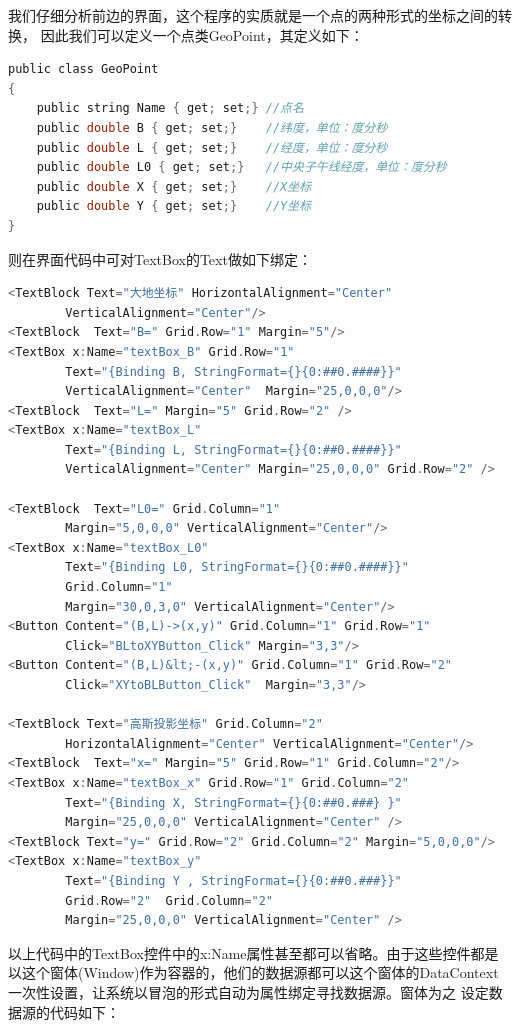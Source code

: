 我们仔细分析前边的界面，这个程序的实质就是一个点的两种形式的坐标之间的转换，
因此我们可以定义一个点类GeoPoint，其定义如下：

\begin{lstlisting}[language=C]
public class GeoPoint
{
    public string Name { get; set;} //点名
    public double B { get; set;}    //纬度，单位：度分秒
    public double L { get; set;}    //经度，单位：度分秒
    public double L0 { get; set;}   //中央子午线经度，单位：度分秒
    public double X { get; set;}    //X坐标
    public double Y { get; set;}    //Y坐标
}
\end{lstlisting}

则在界面代码中可对TextBox的Text做如下绑定：

\begin{lstlisting}[language=C]
<TextBlock Text="大地坐标" HorizontalAlignment="Center"
        VerticalAlignment="Center"/>
<TextBlock  Text="B=" Grid.Row="1" Margin="5"/>
<TextBox x:Name="textBox_B" Grid.Row="1"
        Text="{Binding B, StringFormat={}{0:##0.####}}"
        VerticalAlignment="Center"  Margin="25,0,0,0"/>
<TextBlock  Text="L=" Margin="5" Grid.Row="2" />
<TextBox x:Name="textBox_L"
        Text="{Binding L, StringFormat={}{0:##0.####}}"
        VerticalAlignment="Center" Margin="25,0,0,0" Grid.Row="2" />

<TextBlock  Text="L0=" Grid.Column="1"
        Margin="5,0,0,0" VerticalAlignment="Center"/>
<TextBox x:Name="textBox_L0"
        Text="{Binding L0, StringFormat={}{0:##0.####}}" 
        Grid.Column="1"
        Margin="30,0,3,0" VerticalAlignment="Center"/>
<Button Content="(B,L)->(x,y)" Grid.Column="1" Grid.Row="1"
        Click="BLtoXYButton_Click" Margin="3,3"/>
<Button Content="(B,L)&lt;-(x,y)" Grid.Column="1" Grid.Row="2"
        Click="XYtoBLButton_Click"  Margin="3,3"/>
        
<TextBlock Text="高斯投影坐标" Grid.Column="2"
        HorizontalAlignment="Center" VerticalAlignment="Center"/>
<TextBlock  Text="x=" Margin="5" Grid.Row="1" Grid.Column="2"/>
<TextBox x:Name="textBox_x" Grid.Row="1" Grid.Column="2"
        Text="{Binding X, StringFormat={}{0:##0.###} }"
        Margin="25,0,0,0" VerticalAlignment="Center" />
<TextBlock Text="y=" Grid.Row="2" Grid.Column="2" Margin="5,0,0,0"/>
<TextBox x:Name="textBox_y"
        Text="{Binding Y , StringFormat={}{0:##0.###}}"
        Grid.Row="2"  Grid.Column="2"
        Margin="25,0,0,0" VerticalAlignment="Center" />  
\end{lstlisting}

以上代码中的TextBox控件中的x:Name属性甚至都可以省略。由于这些控件都是
以这个窗体(Window)作为容器的，他们的数据源都可以这个窗体的DataContext
一次性设置，让系统以冒泡的形式自动为属性绑定寻找数据源。窗体为之
设定数据源的代码如下：

